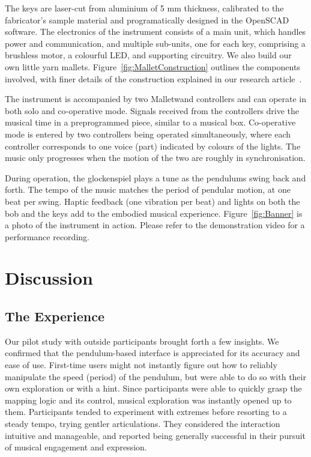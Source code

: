 \documentclass[manuscript,review]{acmart}
\begin{document}
The keys are laser-cut from aluminium of 5 mm thickness, calibrated to the fabricator's sample material and programatically designed in the OpenSCAD software. The electronics of the instrument consists of a main unit, which handles power and communication, and multiple sub-units, one for each key, comprising a brushless motor, a colourful LED, and supporting circuitry. We also build our own little yarn mallets. Figure~\ref{fig:MalletConstruction} outlines the components involved, with finer details of the construction explained in our research article~\cite{nime2024_59}.

The instrument is accompanied by two Malletwand controllers and can operate in both solo and co-operative mode. Signals received from the controllers drive the musical time in a preprogrammed piece, similar to a musical box. Co-operative mode is entered by two controllers being operated simultaneously, where each controller corresponds to one voice (part) indicated by colours of the lights. The music only progresses when the motion of the two are roughly in synchronisation.

During operation, the glockenspiel plays a tune as the pendulums swing back and forth. The tempo of the music matches the period of pendular motion, at one beat per swing. Haptic feedback (one vibration per beat) and lights on both the bob and the keys add to the embodied musical experience. Figure~\ref{fig:Banner} is a photo of the instrument in action. Please refer to the demonstration video for a performance recording.

\section{Discussion}

\subsection{The Experience}
Our pilot study with outside participants brought forth a few insights. We confirmed that the pendulum-based interface is appreciated for its accuracy and ease of use. First-time users might not instantly figure out how to reliably manipulate the speed (period) of the pendulum, but were able to do so with their own exploration or with a hint. Since participants were able to quickly grasp the mapping logic and its control, musical exploration was instantly opened up to them. Participants tended to experiment with extremes before resorting to a steady tempo, trying gentler articulations. They considered the interaction intuitive and manageable, and reported being generally successful in their pursuit of musical engagement and expression.
\end{document}
